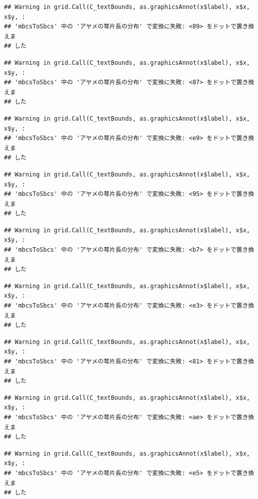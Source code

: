\documentclass[
]{book}
\begin{document}
\begin{verbatim}
## Warning in grid.Call(C_textBounds, as.graphicsAnnot(x$label), x$x, x$y, :
## 'mbcsToSbcs' 中の 'アヤメの萼片長の分布' で変換に失敗: <89> をドットで置き換えま
## した
\end{verbatim}

\begin{verbatim}
## Warning in grid.Call(C_textBounds, as.graphicsAnnot(x$label), x$x, x$y, :
## 'mbcsToSbcs' 中の 'アヤメの萼片長の分布' で変換に失敗: <87> をドットで置き換えま
## した
\end{verbatim}

\begin{verbatim}
## Warning in grid.Call(C_textBounds, as.graphicsAnnot(x$label), x$x, x$y, :
## 'mbcsToSbcs' 中の 'アヤメの萼片長の分布' で変換に失敗: <e9> をドットで置き換えま
## した
\end{verbatim}

\begin{verbatim}
## Warning in grid.Call(C_textBounds, as.graphicsAnnot(x$label), x$x, x$y, :
## 'mbcsToSbcs' 中の 'アヤメの萼片長の分布' で変換に失敗: <95> をドットで置き換えま
## した
\end{verbatim}

\begin{verbatim}
## Warning in grid.Call(C_textBounds, as.graphicsAnnot(x$label), x$x, x$y, :
## 'mbcsToSbcs' 中の 'アヤメの萼片長の分布' で変換に失敗: <b7> をドットで置き換えま
## した
\end{verbatim}

\begin{verbatim}
## Warning in grid.Call(C_textBounds, as.graphicsAnnot(x$label), x$x, x$y, :
## 'mbcsToSbcs' 中の 'アヤメの萼片長の分布' で変換に失敗: <e3> をドットで置き換えま
## した
\end{verbatim}

\begin{verbatim}
## Warning in grid.Call(C_textBounds, as.graphicsAnnot(x$label), x$x, x$y, :
## 'mbcsToSbcs' 中の 'アヤメの萼片長の分布' で変換に失敗: <81> をドットで置き換えま
## した
\end{verbatim}

\begin{verbatim}
## Warning in grid.Call(C_textBounds, as.graphicsAnnot(x$label), x$x, x$y, :
## 'mbcsToSbcs' 中の 'アヤメの萼片長の分布' で変換に失敗: <ae> をドットで置き換えま
## した
\end{verbatim}

\begin{verbatim}
## Warning in grid.Call(C_textBounds, as.graphicsAnnot(x$label), x$x, x$y, :
## 'mbcsToSbcs' 中の 'アヤメの萼片長の分布' で変換に失敗: <e5> をドットで置き換えま
## した
\end{verbatim}
\end{document}
